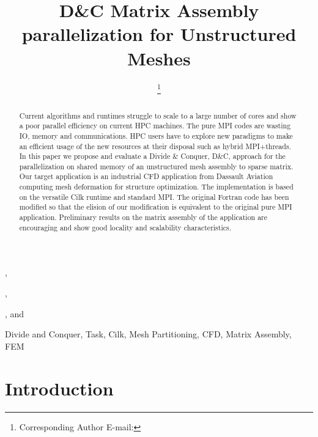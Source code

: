 \documentclass{IOS-Book-Article}
\begin{document}
\begin{frontmatter}              %

\title{D\&C Matrix Assembly parallelization for Unstructured Meshes}

\author[A]{ %
\thanks{Corresponding Author E-mail: }},
\author[A]{ },
\author[A]{ },
and
\author[B]{ }

\address[A]{PRISM - University of Versailles, France}
\address[B]{Dassault Aviation, Saint-Cloud, France}

\begin{abstract}
Current algorithms and runtimes struggle to scale to a large number of cores and show a poor parallel efficiency on current HPC machines.
The pure MPI codes are wasting IO, memory and communications. HPC users have to explore new paradigms to make an efficient usage of the new resources at their disposal such as hybrid MPI+threads.
In this paper we propose and evaluate a Divide \& Conquer, D\&C, approach for the parallelization on shared memory of an unstructured mesh assembly to sparse matrix.
Our target application is an industrial CFD application from Dassault Aviation computing mesh deformation for structure optimization.
The implementation is based on the versatile Cilk runtime and standard MPI. The original Fortran code has been modified so that the elision of our modification is equivalent to the original pure MPI application.
Preliminary results on the matrix assembly of the application are encouraging and show good locality and scalability characteristics.
\end{abstract}

\begin{keyword}
Divide and Conquer, Task, Cilk, Mesh Partitioning, CFD, Matrix Assembly, FEM
\end{keyword}
\end{frontmatter}

\thispagestyle{empty}
\pagestyle{empty}

\section{Introduction}
\end{document}
